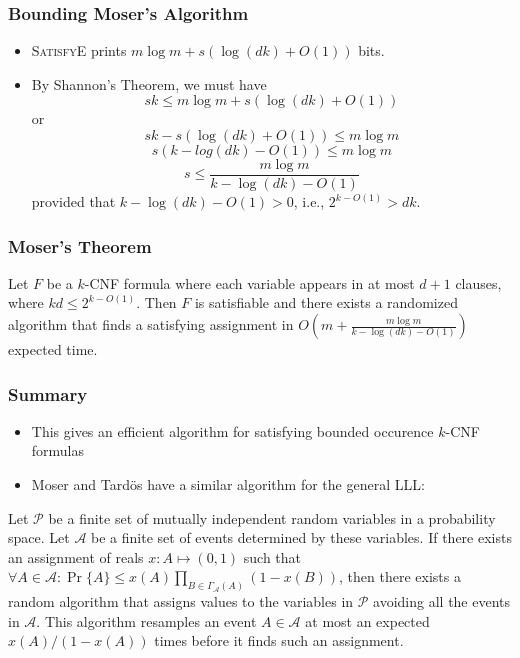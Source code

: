 \documentclass{beamer}
\begin{document}
\frame
{
  \frametitle{Bounding Moser's Algorithm}

  \begin{itemize}
    \item \textsc{SatisfyE} prints $m\log m + s(\log(dk)+O(1))$ bits.
    \item By Shannon's Theorem, we must have
      \[ sk \le  m\log m + s(\log(dk)+O(1)) \]
      or
      \[ sk - s(\log(dk)+O(1)) \le m\log m \]
      \[ s(k - log(dk) - O(1)) \le m\log m \]
      \[ s \le \frac{m\log m}{k - \log(dk) - O(1)} \]
     provided that $k-\log(dk)-O(1) > 0$, i.e., $2^{k-O(1)} > dk$.
  \end{itemize}
}

\frame
{
  \frametitle{Moser's Theorem}

  \begin{thm}
    Let $F$ be a $k$-CNF formula where each variable appears in
    at most $d+1$ clauses, where $kd \le 2^{k-O(1)}$.  Then $F$
    is satisfiable and there exists a randomized algorithm that 
    finds a satisfying assignment in
    $O\left(m + \frac{m\log m}{k - \log(dk) - O(1)}\right)$ expected time.
  \end{thm}
}

\frame
{
  \frametitle{Summary}

  \begin{itemize}
    \item This gives an efficient algorithm for satisfying bounded
      occurence $k$-CNF formulas
    \item Moser and Tard\"os have a similar algorithm for the general LLL:
  \end{itemize}
  \begin{thm}
    Let $\mathcal{P}$ be a finite set of mutually independent random
    variables in a probability space. Let $\mathcal{A}$ be a finite set of
    events determined by these variables. If there exists an assignment
    of reals $x : A \mapsto (0, 1)$ such that $\forall A \in \mathcal{A}
    : \Pr\{A\} \le x(A) \prod_{B\in \Gamma_{\mathcal{A}}(A)}
     (1 - x(B))$,
    then there exists a random algorithm that assigns values to the
    variables in $\mathcal{P}$ avoiding all the events in $\mathcal{A}$.
    This algorithm resamples an event $A \in \mathcal{A}$ at most
    an expected $x(A)/(1 - x(A))$ times before it finds such an
    assignment. 
   \end{thm}
}
\end{document}

